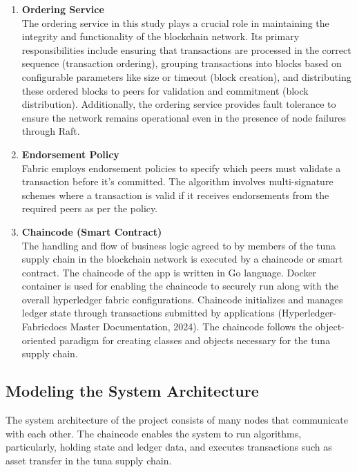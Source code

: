 \begin{enumerate}
		\item \textbf{Ordering Service} \\ The ordering service in this study plays a crucial role in maintaining the integrity and functionality of the blockchain network. Its primary responsibilities include ensuring that transactions are processed in the correct sequence (transaction ordering), grouping transactions into blocks based on configurable parameters like size or timeout (block creation), and distributing these ordered blocks to peers for validation and commitment (block distribution). Additionally, the ordering service provides fault tolerance to ensure the network remains operational even in the presence of node failures through Raft.
		
		\item \textbf{Endorsement Policy} \\Fabric employs endorsement policies to specify which peers must validate a transaction before it's committed. The algorithm involves multi-signature schemes where a transaction is valid if it receives endorsements from the required peers as per the policy.
		
		\item \textbf{Chaincode (Smart Contract)} \\The handling and flow of business logic agreed to by members of the tuna supply chain in the blockchain network is executed by a chaincode or smart contract. The chaincode of the app is written in Go language. Docker container is used for enabling the chaincode to securely run along with the overall hyperledger fabric configurations. Chaincode initializes and manages ledger state through transactions submitted by applications (Hyperledger-Fabricdocs Master Documentation, 2024). The chaincode follows the object-oriented paradigm for creating classes and objects necessary for the tuna supply chain.
		
		
	\end{enumerate}

\subsection{Modeling the System Architecture}
The system architecture of the project consists of many nodes that communicate with each other. The chaincode enables the system to run algorithms, particularly, holding state and ledger data, and executes transactions such as asset transfer in the tuna supply chain. 

